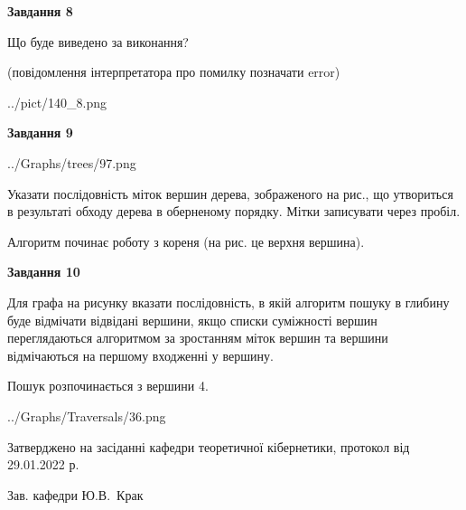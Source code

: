 \documentclass[12pt, ukrainian]{article}
\begin{document}
{\begin {large}
{\begin {center}\textbf{Завдання 8}\end {center}}\par
Що буде виведено за виконання?\par
 (повідомлення інтерпретатора про помилку позначати error)\par
\begin{center}
	{../pict/140_8.png}
\end{center}
\newpage

{\begin {center}\textbf{Завдання 9}\end {center}}\par

\begin{center}
	{../Graphs/trees/97.png}
\end{center}
Указати послідовність міток вершин дерева, зображеного на рис., що утвориться в результаті обходу дерева в оберненому порядку. Мітки записувати через пробіл.\par Алгоритм починає роботу з кореня (на рис. це верхня вершина).\par
\newpage

{\begin {center}\textbf{Завдання 10}\end {center}}\par
Для графа на рисунку вказати послідовність, в якій алгоритм пошуку в глибину буде відмічати відвідані вершини, якщо списки суміжності вершин переглядаються алгоритмом за зростанням міток вершин та вершини відмічаються на першому вход\-женні у вершину.\par
Пошук розпочинається з вершини 4.\par

\begin{center}
	{../Graphs/Traversals/36.png}
\end{center}\par
\newpage


\end {large}
}
{\smallskip \begin {small} Затверджено на засіданні кафедри теоретичної кібернетики, протокол  від   29.01.2022 р.\par\smallskip\smallskip
{\parbox {6.5 cm}{Зав. кафедри \dotfill Ю.В.~Крак}} \end{small}}
\end{document}
